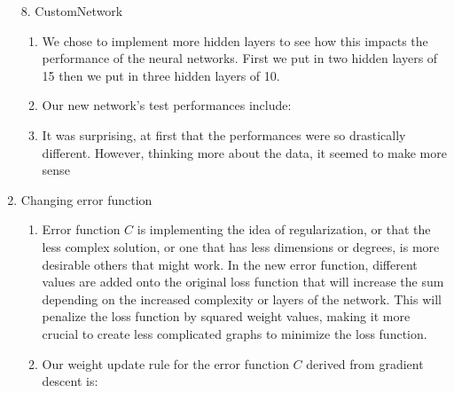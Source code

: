 \documentclass[11pt]{article}
\begin{document}
\begin{enumerate}
\begin{enumerate}
\end{enumerate}
8. CustomNetwork
\begin{enumerate}
\item We chose to implement more hidden layers to see how this impacts the performance of the neural networks. First we put in two hidden layers of 15 then we put in three hidden layers of 10. 
\item Our new network's test performances include:
\item It was surprising, at first that the performances were so drastically different. However, thinking more about the data, it seemed to make more sense 
\end{enumerate}
\item Changing error function
	\begin{enumerate}
	\item Error function $C$ is implementing the idea of regularization, or that the less complex solution, or one that has less dimensions or degrees, is more desirable others that might work. In the new error function, different values are added onto the original loss function that will increase the sum depending on the increased complexity or layers of the network. This will penalize the loss function by squared weight values, making it more crucial to create less complicated graphs to minimize the loss function. 
	\item Our weight update rule for the error function $C$ derived from gradient descent is:
	\end{enumerate}

\end{enumerate}
\end{document}
